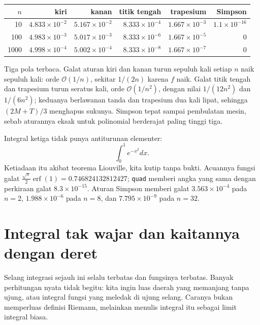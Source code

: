 \begin{center}\small
\begin{tabular}{rrrrrr}
\hline
$n$ & kiri & kanan & titik tengah & trapesium & Simpson \\
\hline
10 & $4.833\times10^{-2}$ & $5.167\times10^{-2}$ & $8.333\times10^{-4}$
   & $1.667\times10^{-3}$ & $1.1\times10^{-16}$ \\
100 & $4.983\times10^{-3}$ & $5.017\times10^{-3}$ & $8.333\times10^{-6}$
   & $1.667\times10^{-5}$ & $0$ \\
1000 & $4.998\times10^{-4}$ & $5.002\times10^{-4}$ & $8.333\times10^{-8}$
   & $1.667\times10^{-7}$ & $0$ \\
\hline
\end{tabular}
\end{center}

Tiga pola terbaca. Galat aturan kiri dan kanan turun sepuluh kali setiap $n$ naik
sepuluh kali: orde $\mathcal{O}(1/n)$, sekitar $1/(2n)$ karena $f$ naik. Galat titik
tengah dan trapesium turun seratus kali, orde $\mathcal{O}(1/n^2)$, dengan nilai
$1/(12n^2)$ dan $1/(6n^2)$; keduanya berlawanan tanda dan trapesium dua kali lipat,
sehingga $(2M+T)/3$ menghapus sukunya. Simpson tepat sampai pembulatan mesin, sebab
aturannya eksak untuk polinomial berderajat paling tinggi tiga.

Integral ketiga tidak punya antiturunan elementer:
\[
\int_0^1 e^{-x^2}dx .
\]
Ketiadaan itu akibat teorema Liouville, kita kutip tanpa bukti. Acuannya fungsi galat
$\frac{\sqrt{\pi}}{2}\operatorname{erf}(1)=0.746824132812427$; \texttt{quad} memberi
angka yang sama dengan perkiraan galat $8.3\times10^{-15}$. Aturan Simpson memberi galat
$3.563\times10^{-4}$ pada $n=2$, $1.988\times10^{-6}$ pada $n=8$, dan
$7.795\times10^{-9}$ pada $n=32$.


\section{Integral tak wajar dan kaitannya dengan deret}

Selang integrasi sejauh ini selalu terbatas dan fungsinya terbatas. Banyak perhitungan
nyata tidak begitu: kita ingin luas daerah yang memanjang tanpa ujung, atau integral
fungsi yang meledak di ujung selang. Caranya bukan memperluas definisi Riemann,
melainkan menulis integral itu sebagai limit integral biasa.

